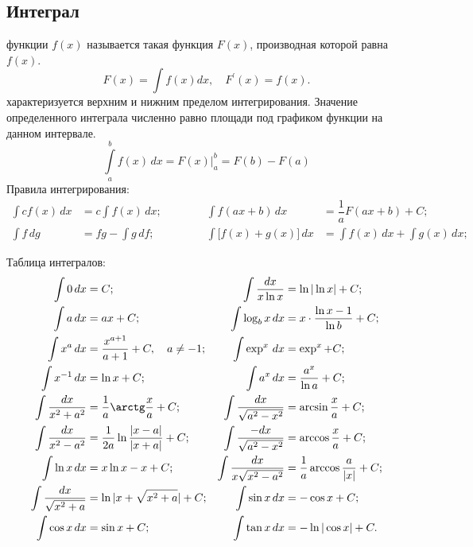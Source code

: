 \subsection{Интеграл}
 функции $f(x)$ называется такая функция $F(x)$, производная которой равна $f(x)$.
\begin{equation}
F(x) = \int f(x)dx,\quad F^\prime(x)=f(x).
\end{equation}
 характеризуется верхним и нижним пределом интегрирования. Значение определенного интеграла численно равно площади под графиком функции на данном интервале.
\begin{equation}
\int\limits^b_a f(x)\,dx = F(x) \biggr|^b_a = F(b) - F(a)
\end{equation}
Правила интегрирования:
\begin{align*}	
\int c f(x) \,dx &= c \int f(x) \,dx;  &&&&&\int f(ax + b) \,dx &= \dfrac{1}{a}F(ax + b) + C;\\
\int f \,dg &= fg - \int g \,df; &&&&& \int \bigl[f(x) + g(x)\bigr] \,dx &= \int f(x) \,dx + \int g(x) \,dx;
\end{align*}

Таблица интегралов:
\begin{align*}
\int 0 \,dx &= C; & \int \dfrac{dx}{x \ln x} &= \ln |\ln x| + C; \\
\int a \,dx &= ax + C; & \int \log_b x \,dx &= x\cdot \dfrac{\ln x - 1}{\ln b} + C;\\
\int x^a \,dx &= \dfrac{x^{a+1}}{a+1} + C,\quad a \neq -1; & \int \exp^x \,dx &= \exp^x + C; \\
\int x^{-1} \,dx &= \ln x + C; & \int a^x \,dx &= \dfrac{a^x}{\ln a} + C;\\
\int \dfrac{dx}{x^2 + a^2} &= \dfrac{1}{a} \arctg \dfrac{x}{a} + C; & \int \dfrac{dx}{\sqrt{a^2 - x^2}} &= \arcsin\dfrac{x}{a} + C;\\
\int \dfrac{dx}{x^2 - a^2} &= \dfrac{1}{2a} \ln \dfrac{|x - a|}{|x + a|} + C; & \int \dfrac{-dx}{\sqrt{a^2 - x^2}} &= \arccos\dfrac{x}{a} + C;\\
\int \ln x \,dx &= x \ln x - x + C; & \int \dfrac{dx}{x \sqrt{x^2 - a^2}} &= \dfrac{1}{a}\arccos\dfrac{a}{|x|} + C;\\
\int \dfrac{dx}{\sqrt{x^2 + a}} &= \ln|x + \sqrt{x^2 + a}| + C; & \int \sin x \,dx &= -\cos x + C;\\
\int \cos x \,dx &= \sin x + C; & \int \tan x \,dx &= - \ln|\cos x| + C.
\end{align*}